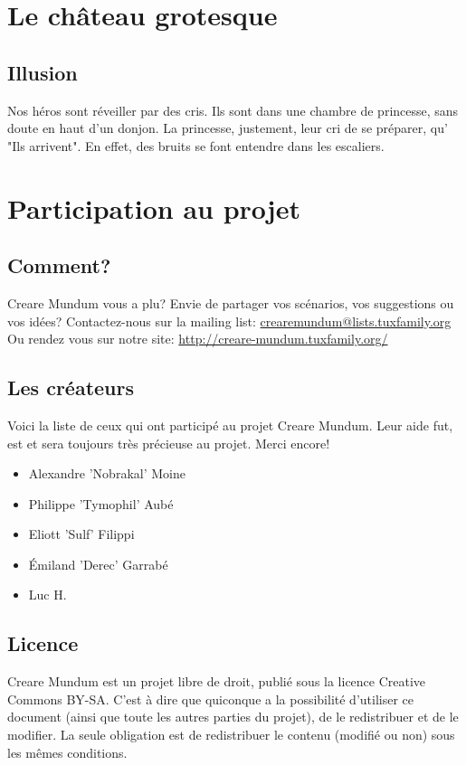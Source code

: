 \documentclass[a4paper, 11pt]{article}
\begin{document}
\section{Le château grotesque}
\subsection{Illusion}
Nos héros sont réveiller par des cris. Ils sont dans une chambre de princesse, sans doute en haut d'un donjon. La princesse, justement, leur cri de se préparer, qu' "Ils arrivent". En effet, des bruits se font entendre dans les escaliers.


\newpage
\section{Participation au projet}
\subsection{Comment?}
\hypertarget{participation}{}
Creare Mundum vous a plu? 
Envie de partager vos scénarios, vos suggestions ou vos idées?
\newline
Contactez-nous sur la mailing list: \href {mailto:crearemundum@lists.tuxfamily.org}{crearemundum@lists.tuxfamily.org}
\newline
Ou rendez vous sur notre site: \href {http://creare-mundum.tuxfamily.org/} {http://creare-mundum.tuxfamily.org/}
\subsection{Les créateurs}
Voici la liste de ceux qui ont participé au projet Creare Mundum. Leur aide fut, est et sera toujours très précieuse au projet. Merci encore!  
\begin{itemize}
\item Alexandre ’Nobrakal’ Moine 
\item Philippe ’Tymophil’ Aubé 
\item Eliott ’Sulf’ Filippi
\item Émiland ’Derec’ Garrabé
\item Luc H.
\end{itemize}
\subsection{Licence}
Creare Mundum est un projet libre de droit, publié sous la licence Creative Commons BY-SA. C'est à dire que quiconque a la possibilité d'utiliser ce document (ainsi que toute les autres parties du projet), de le redistribuer et de le modifier. La seule obligation est de redistribuer le contenu (modifié ou non) sous les mêmes conditions.
\end{document}
